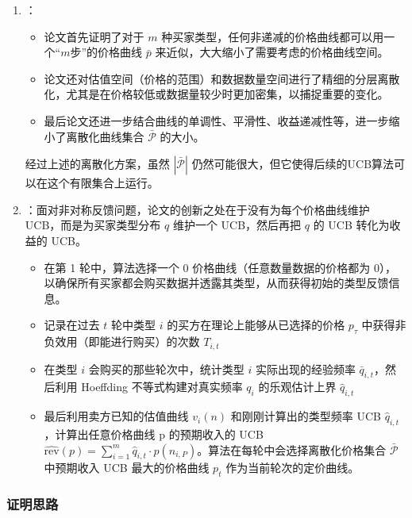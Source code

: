 \begin{enumerate}
    \item {}：
        \begin{itemize}
            \item 论文首先证明了对于 $m$ 种买家类型，任何非递减的价格曲线都可以用一个“$m$步”的价格曲线 $\bar{p}$ 来近似，大大缩小了需要考虑的价格曲线空间。
            \item 论文还对估值空间（价格的范围）和数据数量空间进行了精细的分层离散化，尤其是在价格较低或数据量较少时更加密集，以捕捉重要的变化。
            \item 最后论文还进一步结合曲线的单调性、平滑性、收益递减性等，进一步缩小了离散化曲线集合 $\bar{\mathcal{P}}$ 的大小。
        \end{itemize}

        经过上述的离散化方案，虽然 $|\bar{\mathcal{P}}|$ 仍然可能很大，但它使得后续的UCB算法可以在这个有限集合上运行。

    \item {}：面对非对称反馈问题，论文的创新之处在于没有为每个价格曲线维护 UCB，而是为买家类型分布 $q$ 维护一个 UCB，然后再把 $q$ 的 UCB 转化为收益的 UCB。
    
        \begin{itemize}
            \item 在第 1 轮中，算法选择一个 0 价格曲线（任意数量数据的价格都为 0），以确保所有买家都会购买数据并透露其类型，从而获得初始的类型反馈信息。
            \item 记录在过去 $t$ 轮中类型 $i$ 的买方在理论上能够从已选择的价格 $p_{\tau}$ 中获得非负效用（即能进行购买）的次数 $T_{i, t}$
            \item 在类型 $i$ 会购买的那些轮次中，统计类型 $i$ 实际出现的经验频率 $\bar{q}_{i,t}$，然后利用 Hoeffding 不等式构建对真实频率 $q_i$ 的乐观估计上界 $\hat{q}_{i,t}$
            \item 最后利用卖方已知的估值曲线 $v_i(n)$ 和刚刚计算出的类型频率 UCB $\hat{q}_{i,t}$，计算出任意价格曲线 p 的预期收入的 UCB $\widehat{\text{rev}}(p) = \sum_{i=1}^{m} \hat{q}_{i,t} \cdot p(n_{i,P})$。算法在每轮中会选择离散化价格集合 $\bar{\mathcal{P}}$ 中预期收入 UCB 最大的价格曲线 $p_t$ 作为当前轮次的定价曲线。
        \end{itemize}
\end{enumerate}

\subsubsection{证明思路}

